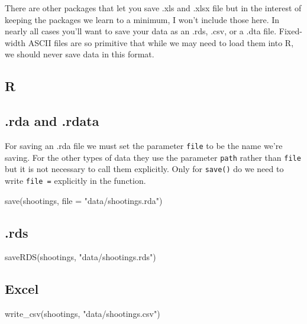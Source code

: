 \documentclass[
]{krantz}
\makeatletter
\newenvironment{Shaded}{\begin{snugshade}}{\end{snugshade}}
\newcommand{\AttributeTok}[1]{\textcolor[rgb]{0.61,0.61,0.61}{#1}}
\newcommand{\FunctionTok}[1]{\textcolor[rgb]{0,0,0}{#1}}
\newcommand{\NormalTok}[1]{#1}
\newcommand{\StringTok}[1]{\textcolor[rgb]{0.5,0.5,0.5}{#1}}
\newenvironment{kframe}{%
\medskip{}
\setlength{\fboxsep}{.8em}
 \def\at@end@of@kframe{}%
 \ifinner\ifhmode%
  \def\at@end@of@kframe{\end{minipage}}%
  \begin{minipage}{\columnwidth}%
 \fi\fi%
 \def\FrameCommand##1{\hskip\@totalleftmargin \hskip-\fboxsep
 \colorbox{shadecolor}{##1}\hskip-\fboxsep
     \hskip-\linewidth \hskip-\@totalleftmargin \hskip\columnwidth}%
 \MakeFramed {\advance\hsize-\width
   \@totalleftmargin\z@ \linewidth\hsize
   \@setminipage}}%
 {\par\unskip\endMakeFramed%
 \at@end@of@kframe}
\renewenvironment{Shaded}{\begin{kframe}}{\end{kframe}}
\makeatother
\begin{document}
There are other packages that let you save .xls and .xlsx file but in the interest of keeping the packages we learn to a minimum, I won't include those here. In nearly all cases you'll want to save your data as an .rds, .csv, or a .dta file. Fixed-width ASCII files are so primitive that while we may need to load them into R, we should never save data in this format.

\hypertarget{r-1}{%
\subsection{R}\label{r-1}}

\hypertarget{rda-and-.rdata}{%
\subsection{.rda and .rdata}\label{rda-and-.rdata}}

For saving an .rda file we must set the parameter \texttt{file} to be the name we're saving. For the other types of data they use the parameter \texttt{path} rather than \texttt{file} but it is not necessary to call them explicitly. Only for \texttt{save()} do we need to write \texttt{file\ =} explicitly in the function.

\begin{Shaded}
\begin{Highlighting}[]
\FunctionTok{save}\NormalTok{(shootings, }\AttributeTok{file =}  \StringTok{"data/shootings.rda"}\NormalTok{)}
\end{Highlighting}
\end{Shaded}

\hypertarget{rds}{%
\subsection{.rds}\label{rds}}

\begin{Shaded}
\begin{Highlighting}[]
\FunctionTok{saveRDS}\NormalTok{(shootings, }\StringTok{"data/shootings.rds"}\NormalTok{)}
\end{Highlighting}
\end{Shaded}

\hypertarget{excel-1}{%
\subsection{Excel}\label{excel-1}}

\begin{Shaded}
\begin{Highlighting}[]
\FunctionTok{write\_csv}\NormalTok{(shootings, }\StringTok{"data/shootings.csv"}\NormalTok{)}
\end{Highlighting}
\end{Shaded}
\end{document}
